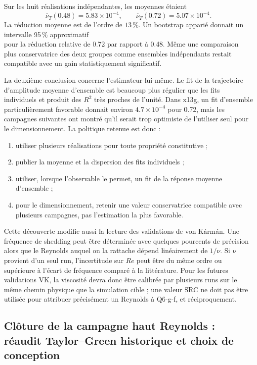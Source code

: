 \documentclass[11pt,a4paper]{article}
\begin{document}
Sur les huit réalisations indépendantes, les moyennes étaient
\begin{equation}
  \overline\nu_T(0.48)=5.83\times10^{-4},
  \qquad
  \overline\nu_T(0.72)=5.07\times10^{-4}.
\end{equation}
La réduction moyenne est de l'ordre de $13\,\%$. Un bootstrap apparié donnait un intervalle 95\,\% approximatif
\begin{equation}
  [4.5\,\%,19.7\,\%]
\end{equation}
pour la réduction relative de 0.72 par rapport à 0.48. Même une comparaison plus conservatrice des deux groupes comme ensembles indépendants restait compatible avec un gain statistiquement significatif.

La deuxième conclusion concerne l'estimateur lui-même. Le fit de la trajectoire d'amplitude moyenne d'ensemble est beaucoup plus régulier que les fits individuels et produit des $R^2$ très proches de l'unité. Dans x13g, un fit d'ensemble particulièrement favorable donnait environ $4.7\times10^{-4}$ pour 0.72, mais les campagnes suivantes ont montré qu'il serait trop optimiste de l'utiliser seul pour le dimensionnement. La politique retenue est donc :
\begin{enumerate}[leftmargin=2em]
  \item utiliser plusieurs réalisations pour toute propriété constitutive ;
  \item publier la moyenne et la dispersion des fits individuels ;
  \item utiliser, lorsque l'observable le permet, un fit de la réponse moyenne d'ensemble ;
  \item pour le dimensionnement, retenir une valeur conservatrice compatible avec plusieurs campagnes, pas l'estimation la plus favorable.
\end{enumerate}

Cette découverte modifie aussi la lecture des validations de von Kármán. Une fréquence de shedding peut être déterminée avec quelques pourcents de précision alors que le Reynolds auquel on la rattache dépend linéairement de $1/\nu$. Si $\nu$ provient d'un seul run, l'incertitude sur $Re$ peut être du même ordre ou supérieure à l'écart de fréquence comparé à la littérature. Pour les futures validations VK, la viscosité devra donc être calibrée par plusieurs runs sur le même chemin physique que la simulation cible ; une valeur SRC ne doit pas être utilisée pour attribuer précisément un Reynolds à Q6-g-f, et réciproquement.

\subsection{Clôture de la campagne haut Reynolds : réaudit Taylor--Green historique et choix de conception}
\label{sec:x13-highre-tg-reaudit}
\end{document}
